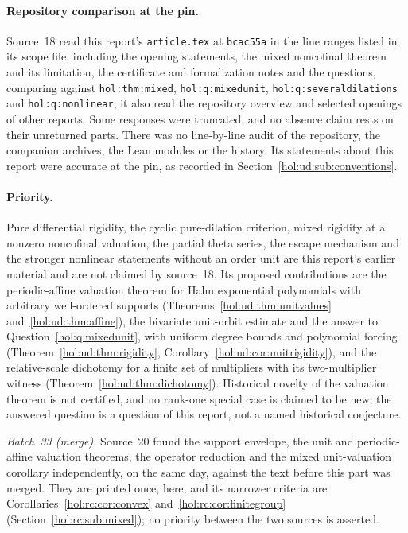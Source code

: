 \documentclass[11pt]{article}
\numberwithin{equation}{section}
\theoremstyle{definition}
\theoremstyle{remark}
\begin{document}
\paragraph{Repository comparison at the pin.}
Source~18 read this report's \texttt{article.tex} at \texttt{bcac55a} in the
line ranges listed in its scope file, including the opening statements, the
mixed noncofinal theorem and its limitation, the certificate and
formalization notes and the questions, comparing against
\texttt{hol:thm:mixed}, \texttt{hol:q:mixedunit},
\texttt{hol:q:severaldilations} and \texttt{hol:q:nonlinear}; it also read the
repository overview and selected openings of other reports. Some responses
were truncated, and no absence claim rests on their unreturned parts. There
was no line-by-line audit of the repository, the companion archives, the Lean
modules or the history. Its statements about this report were accurate at
the pin, as recorded in Section~\ref{hol:ud:sub:conventions}.

\paragraph{Priority.}
Pure differential rigidity, the cyclic pure-dilation criterion, mixed
rigidity at a nonzero noncofinal valuation, the partial theta series, the
escape mechanism and the stronger nonlinear statements without an order unit
are this report's earlier material and are not claimed by source~18. Its
proposed contributions are the periodic-affine valuation theorem for Hahn
exponential polynomials with arbitrary well-ordered supports
(Theorems~\ref{hol:ud:thm:unitvalues} and~\ref{hol:ud:thm:affine}), the
bivariate unit-orbit estimate and the answer to
Question~\ref{hol:q:mixedunit}, with uniform degree bounds and polynomial
forcing (Theorem~\ref{hol:ud:thm:rigidity},
Corollary~\ref{hol:ud:cor:unitrigidity}), and the relative-scale dichotomy
for a finite set of multipliers with its two-multiplier witness
(Theorem~\ref{hol:ud:thm:dichotomy}). Historical novelty of the valuation
theorem is not certified, and no rank-one special case is claimed to be new;
the answered question is a question of this report, not a named historical
conjecture.

\emph{Batch~33 (merge).} Source~20 found the support envelope, the unit and
periodic-affine valuation theorems, the operator reduction and the mixed
unit-valuation corollary independently, on the same day, against the text
before this part was merged. They are printed once, here, and its narrower
criteria are Corollaries~\ref{hol:rc:cor:convex}
and~\ref{hol:rc:cor:finitegroup} (Section~\ref{hol:rc:sub:mixed}); no priority
between the two sources is asserted.
\end{document}
